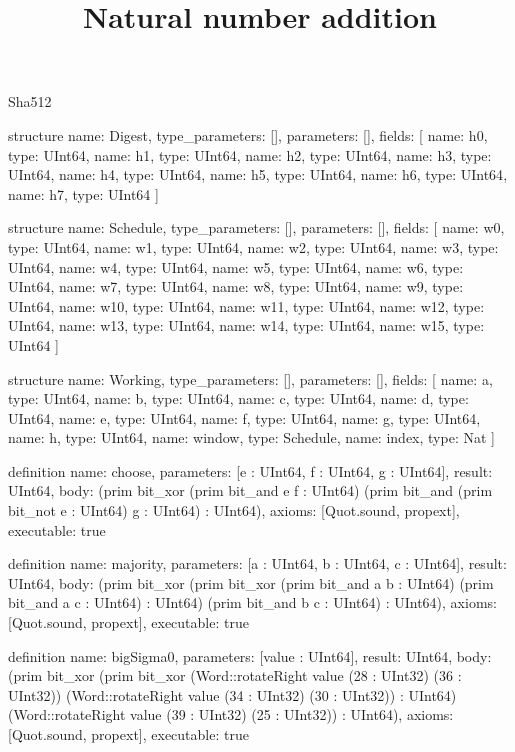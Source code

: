 \begin{lexlean}{Sha512}
\title{Natural number addition}
\begin{semanticmodule}
structure{
  name: Digest,
  type_parameters: [],
  parameters: [],
  fields: [
    {name: h0, type: UInt64},
    {name: h1, type: UInt64},
    {name: h2, type: UInt64},
    {name: h3, type: UInt64},
    {name: h4, type: UInt64},
    {name: h5, type: UInt64},
    {name: h6, type: UInt64},
    {name: h7, type: UInt64}
  ]
}

structure{
  name: Schedule,
  type_parameters: [],
  parameters: [],
  fields: [
    {name: w0, type: UInt64},
    {name: w1, type: UInt64},
    {name: w2, type: UInt64},
    {name: w3, type: UInt64},
    {name: w4, type: UInt64},
    {name: w5, type: UInt64},
    {name: w6, type: UInt64},
    {name: w7, type: UInt64},
    {name: w8, type: UInt64},
    {name: w9, type: UInt64},
    {name: w10, type: UInt64},
    {name: w11, type: UInt64},
    {name: w12, type: UInt64},
    {name: w13, type: UInt64},
    {name: w14, type: UInt64},
    {name: w15, type: UInt64}
  ]
}

structure{
  name: Working,
  type_parameters: [],
  parameters: [],
  fields: [
    {name: a, type: UInt64},
    {name: b, type: UInt64},
    {name: c, type: UInt64},
    {name: d, type: UInt64},
    {name: e, type: UInt64},
    {name: f, type: UInt64},
    {name: g, type: UInt64},
    {name: h, type: UInt64},
    {name: window, type: Schedule},
    {name: index, type: Nat}
  ]
}

definition{
  name: choose,
  parameters: [e : UInt64, f : UInt64, g : UInt64],
  result: UInt64,
  body: (prim bit_xor (prim bit_and e f : UInt64) (prim bit_and (prim bit_not e : UInt64) g : UInt64) : UInt64),
  axioms: [Quot.sound, propext],
  executable: true
}

definition{
  name: majority,
  parameters: [a : UInt64, b : UInt64, c : UInt64],
  result: UInt64,
  body: (prim bit_xor (prim bit_xor (prim bit_and a b : UInt64) (prim bit_and a c : UInt64) : UInt64) (prim bit_and b c : UInt64) : UInt64),
  axioms: [Quot.sound, propext],
  executable: true
}

definition{
  name: bigSigma0,
  parameters: [value : UInt64],
  result: UInt64,
  body: (prim bit_xor (prim bit_xor (Word::rotateRight value (28 : UInt32) (36 : UInt32)) (Word::rotateRight value (34 : UInt32) (30 : UInt32)) : UInt64) (Word::rotateRight value (39 : UInt32) (25 : UInt32)) : UInt64),
  axioms: [Quot.sound, propext],
  executable: true
}


\end{semanticmodule}
\end{lexlean}
